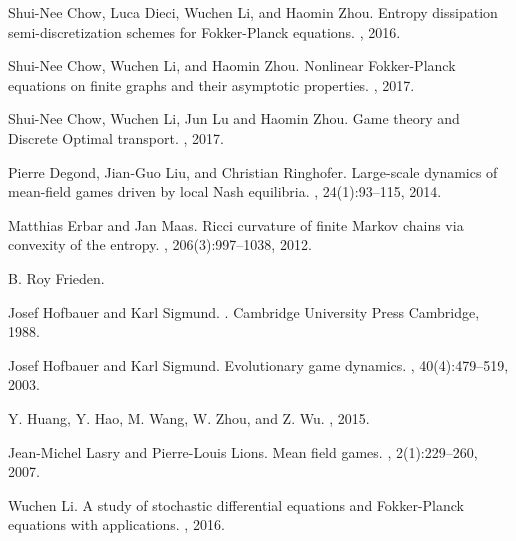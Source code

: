 \documentclass[11pt,reqno]{amsart}
\begin{document}
\begin{thebibliography}{10}
Shui-Nee Chow, Luca Dieci, Wuchen Li, and Haomin Zhou.
\newblock Entropy dissipation semi-discretization schemes for Fokker-Planck equations.
, 2016.

Shui-Nee Chow, Wuchen Li, and Haomin Zhou.
\newblock Nonlinear Fokker-Planck equations on finite graphs and their
  asymptotic properties.
, 2017.

Shui-Nee Chow, Wuchen Li, Jun Lu and Haomin Zhou.
\newblock Game theory and Discrete Optimal transport.
, 2017.

Pierre Degond, Jian-Guo Liu, and Christian Ringhofer.
\newblock Large-scale dynamics of mean-field games driven by local Nash
  equilibria.
, 24(1):93--115, 2014.

Matthias Erbar and Jan Maas.
\newblock Ricci curvature of finite Markov chains via convexity of the entropy.
, 206(3):997--1038, 2012.

B. Roy Frieden.
  
  
Josef Hofbauer and Karl Sigmund.
.
\newblock Cambridge University Press Cambridge, 1988.

Josef Hofbauer and Karl Sigmund.
\newblock Evolutionary game dynamics.
, 40(4):479--519,
  2003.

Y. Huang, Y. Hao, M. Wang, W. Zhou, and Z. Wu.
, 2015.

Jean-Michel Lasry and Pierre-Louis Lions.
\newblock Mean field games.
, 2(1):229--260, 2007.

  Wuchen Li.
  \newblock A study of stochastic differential equations and Fokker-Planck equations with applications.
  , 2016.




\end{thebibliography}
\end{document}

